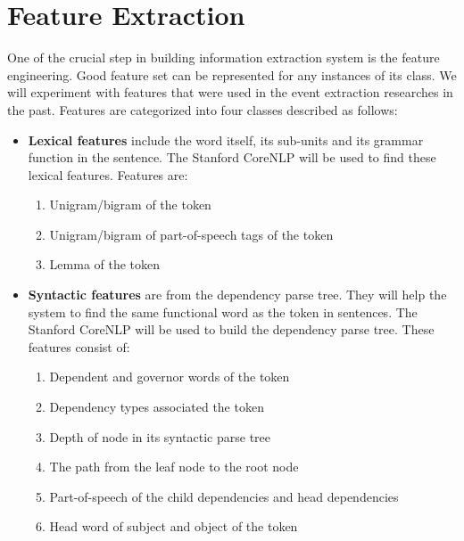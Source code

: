 \section{Feature Extraction}
\label{featureextraction}
One of the crucial step in building information extraction system is the feature engineering. Good feature set can be represented for any instances of its class. We will experiment with features that were used in the event extraction researches in the past. Features are categorized into four classes described as follows:
\begin{itemize}
    

\item \textbf{Lexical features} include the word itself, its sub-units and its grammar function in the sentence. The Stanford CoreNLP \cite{manning2014stanford} will be used to find these lexical features. Features are:
\begin{enumerate}
    \item Unigram/bigram of the token
    \item Unigram/bigram of part-of-speech tags of the token
    \item Lemma of the token 

\end{enumerate}

\item \textbf{Syntactic features} are from the dependency parse tree. They will help the system to find the same functional word as the token in sentences. The Stanford CoreNLP \cite{manning2014stanford} will be used to build the dependency parse tree. These features consist of:
\begin{enumerate}
    \item Dependent and governor words of the token 
    \item Dependency types associated the token 
    \item Depth of node in its syntactic parse tree
    \item The path from the leaf node to the root node
    \item Part-of-speech of the child dependencies and head dependencies
    \item Head word of subject and object of the token

\end{enumerate}


\end{itemize}
